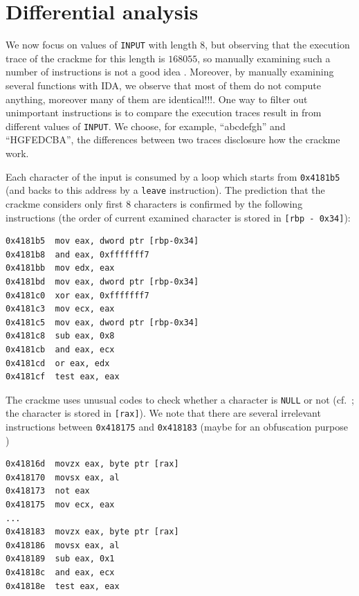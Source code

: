 \documentclass{easychair}
\begin{document}
\section{Differential analysis}
We now focus on values of \texttt{INPUT} with length $8$, but observing that the execution trace of the crackme for this length is $168055$, so manually examining such a number of instructions is not a good idea \smiley{}. Moreover, by manually examining several functions with IDA, we observe that most of them do not compute anything, moreover many of them are  identical!!!. One way to filter out unimportant instructions is to compare the execution traces result in from different values of \texttt{INPUT}. We choose, for example, ``abcdefgh'' and ``HGFEDCBA'', the differences between two traces disclosure how the crackme work.

Each character of the input is consumed by a loop which starts from \texttt{0x4181b5} (and backs to this address by a \texttt{leave} instruction). The prediction that the crackme considers only first $8$ characters is confirmed by the following instructions (the order of current examined character is stored in \texttt{[rbp - 0x34]}):
\begin{lstlisting}[frame=lines, caption={Checking if length is $8$}, captionpos=b, boxpos=b, language={[x86masm]Assembler}, label=lst:checklength]
0x4181b5  mov eax, dword ptr [rbp-0x34]
0x4181b8  and eax, 0xfffffff7
0x4181bb  mov edx, eax
0x4181bd  mov eax, dword ptr [rbp-0x34]
0x4181c0  xor eax, 0xfffffff7
0x4181c3  mov ecx, eax
0x4181c5  mov eax, dword ptr [rbp-0x34]
0x4181c8  sub eax, 0x8
0x4181cb  and eax, ecx
0x4181cd  or eax, edx
0x4181cf  test eax, eax
\end{lstlisting}
The crackme uses unusual codes to check whether a character is \texttt{NULL} or not (cf.~; the character is stored in \texttt{[rax]}). We note that there are several irrelevant instructions between \texttt{0x418175} and \texttt{0x418183} (maybe for an obfuscation purpose \smiley{})
\begin{lstlisting}[frame=lines, caption={Checking if character is \texttt{NULL}}, captionpos=b, boxpos=b, language={[x86masm]Assembler}, label=lst:checknull]
0x41816d  movzx eax, byte ptr [rax]
0x418170  movsx eax, al
0x418173  not eax
0x418175  mov ecx, eax
...
0x418183  movzx eax, byte ptr [rax]
0x418186  movsx eax, al
0x418189  sub eax, 0x1
0x41818c  and eax, ecx
0x41818e  test eax, eax
\end{lstlisting}
\end{document}
